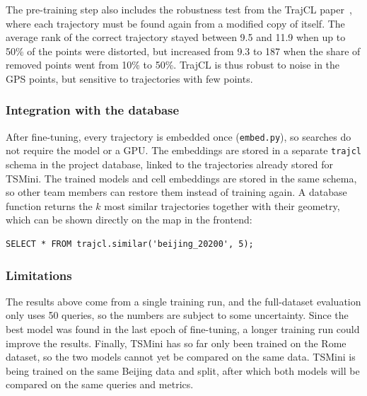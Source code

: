 The pre-training step also includes the robustness test from the TrajCL paper~\cite{trajcl}, where each trajectory must be found again from a modified copy of itself. The average rank of the correct trajectory stayed between 9.5 and 11.9 when up to 50\% of the points were distorted, but increased from 9.3 to 187 when the share of removed points went from 10\% to 50\%. TrajCL is thus robust to noise in the GPS points, but sensitive to trajectories with few points.

\subsubsection*{Integration with the database}

After fine-tuning, every trajectory is embedded once (\texttt{embed.py}), so searches do not require the model or a GPU. The embeddings are stored in a separate \texttt{trajcl} schema in the project database, linked to the trajectories already stored for TSMini. The trained models and cell embeddings are stored in the same schema, so other team members can restore them instead of training again. A database function returns the $k$ most similar trajectories together with their geometry, which can be shown directly on the map in the frontend:

\begin{verbatim}
SELECT * FROM trajcl.similar('beijing_20200', 5);
\end{verbatim}

\subsubsection*{Limitations}

The results above come from a single training run, and the full-dataset evaluation only uses 50 queries, so the numbers are subject to some uncertainty. Since the best model was found in the last epoch of fine-tuning, a longer training run could improve the results. Finally, TSMini has so far only been trained on the Rome dataset, so the two models cannot yet be compared on the same data. TSMini is being trained on the same Beijing data and split, after which both models will be compared on the same queries and metrics.
